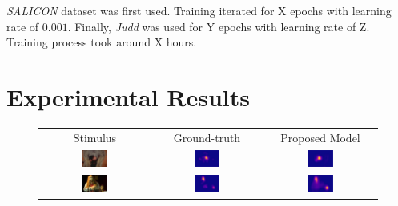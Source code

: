 \documentclass[10pt,twocolumn,letterpaper]{article}
\begin{document}
\emph{SALICON} dataset was first used.
Training iterated for X epochs with learning rate of $0.001$.
Finally, \emph{Judd} was used for Y epochs with learning rate of Z.
Training process took around X hours.

\section{Experimental Results}
\begin{figure}
\begin{center}
    \begin{tabular} {ccc}
    Stimulus & Ground-truth & Proposed Model\\
    \includegraphics[width=0.25\textwidth]{./img/monkey_s.jpg} &
    \includegraphics[width=0.25\textwidth]{./img/monkey_gt.jpg} &
    \includegraphics[width=0.25\textwidth]{./img/monkey_m.jpg}\\
    \includegraphics[width=0.25\textwidth]{./img/person_s.jpg} &
    \includegraphics[width=0.25\textwidth]{./img/person_gt.jpg} &
    \includegraphics[width=0.25\textwidth]{./img/person_m.jpg}\\

\end{tabular}
\end{center}
\end{figure}
\end{document}
